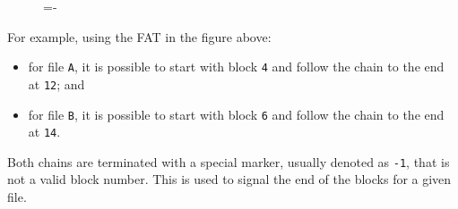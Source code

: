 \documentclass[a4paper]{systems-software}
\begin{document}
\begin{figure}[H]
  \lineskip=-\fboxrule
\end{figure}

For example, using the FAT in the figure above:
\begin{itemize}
	\item for file \texttt{A}, it is possible to start with block \texttt{4} and follow the chain to the end at \texttt{12}; and
	\item for file \texttt{B}, it is possible to start with block \texttt{6} and follow the chain to the end at \texttt{14}.
\end{itemize}

Both chains are terminated with a special marker, usually denoted as \texttt{-1}, that is not a valid block number. This is used to signal the end of the blocks for a given file.
\end{document}
